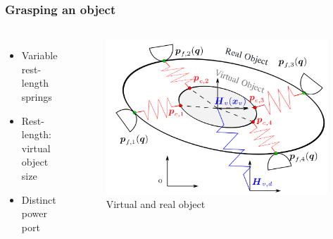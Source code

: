 \documentclass[student]{ITRslides}
\begin{document}
\begin{frame}
	\frametitle{Grasping an object}
\begin{columns}
			
	
		\begin{itemize}
			\item Variable rest-length springs
			\item Rest-length: virtual object size
			\item Distinct power port
		\end{itemize}

		
             \begin{figure}[htb]
			\centering
			\includegraphics[width=0.98\textwidth]{IPCobjects.png}
			\caption{Virtual and real object \cite{Wimboeck_08}}
			\end{figure}
		
			
		\end{columns}
\end{frame}


\end{document}

